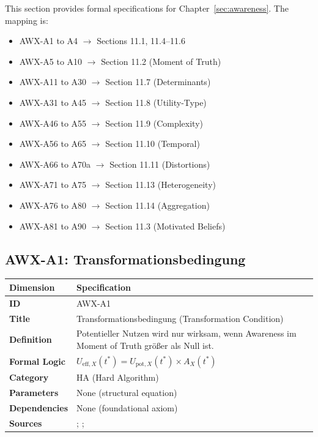\begin{note}
This section provides formal specifications for Chapter~\ref{sec:awareness}. 
The mapping is:
\begin{itemize}
    \item AWX-A1 to A4 $\rightarrow$ Sections 11.1, 11.4--11.6
    \item AWX-A5 to A10 $\rightarrow$ Section 11.2 (Moment of Truth)
    \item AWX-A11 to A30 $\rightarrow$ Section 11.7 (Determinants)
    \item AWX-A31 to A45 $\rightarrow$ Section 11.8 (Utility-Type)
    \item AWX-A46 to A55 $\rightarrow$ Section 11.9 (Complexity)
    \item AWX-A56 to A65 $\rightarrow$ Section 11.10 (Temporal)
    \item AWX-A66 to A70a $\rightarrow$ Section 11.11 (Distortions)
    \item AWX-A71 to A75 $\rightarrow$ Section 11.13 (Heterogeneity)
    \item AWX-A76 to A80 $\rightarrow$ Section 11.14 (Aggregation)
    \item AWX-A81 to A90 $\rightarrow$ Section 11.3 (Motivated Beliefs)
\end{itemize}
\end{note}

\subsection{AWX-A1: Transformationsbedingung}

\begin{table}[htbp]
\small
\begin{tabular}{p{3cm}p{11cm}}
\toprule
\textbf{Dimension} & \textbf{Specification} \\
\midrule
\textbf{ID} & AWX-A1 \\
\textbf{Title} & Transformationsbedingung (Transformation Condition) \\
\textbf{Definition} & Potentieller Nutzen wird nur wirksam, wenn Awareness im Moment of Truth größer als Null ist. \\
\textbf{Formal Logic} & $U_{\text{eff},X}(t^*) = U_{\text{pot},X}(t^*) \times A_X(t^*)$ \\
\textbf{Category} & HA (Hard Algorithm) \\
\textbf{Parameters} & None (structural equation) \\
\textbf{Dependencies} & None (foundational axiom) \\
\textbf{Sources} & \citet{PAP-kahneman2003maps}; \citet{PAP-rangel2008framework}; \citet{fehr2011neuro} \\
\bottomrule
\end{tabular}
\end{table}

